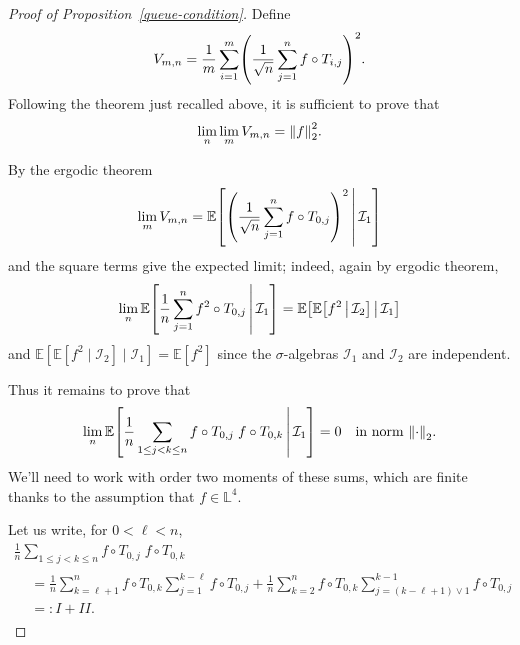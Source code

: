 \documentclass[AHL,Unicode,longabstracts,published]{cedram}
\newcommand*\bbL{\mathbb{L}}
\newcommand{\bbE}{\mathbb{E}}
\newcommand{\E}[1]{\bbE\left[#1\right]}
\newcommand*\I{\mathcal{I}}
\newcommand{\norm}[1]{\left\lVert #1\right\rVert}
\let\originalleft\left
\let\originalright\right
\renewcommand{\left}{\mathopen{}\mathclose\bgroup\originalleft}
\renewcommand{\right}{\aftergroup\egroup\originalright}
\begin{document}
\begin{proof}[Proof of Proposition~\ref{queue-condition}]
Define
\begin{equation}\label{eq:def_Vmn}
V_{m,n}=\frac 1m\sum_{i=1}^m \left(\frac 1{\sqrt n}\sum_{j=1}^n f\circ T_{i,j}\right)^2.
\end{equation}
Following the theorem just recalled above, it is sufficient to prove that
\[
\lim_{n}\lim_{m} V_{m,n}=\norm{f}_2^2.
\]

By the ergodic theorem
\[
\lim_m V_{m,n}= \E{\left(\frac 1{\sqrt n}\sum_{j=1}^n f\circ T_{0,j}\right)^2\,\middle|\,\I_1}
\]
and the square terms give the expected limit; indeed, again by ergodic theorem,
\[
\lim_n \E{\frac 1{n}\sum_{j=1}^n f^2\circ T_{0,j}\,\middle|\,\I_1}=\E{\E{f^2\,\middle|\,\I_2}\,\middle|\,\I_1}
\]
and $\bbE[\bbE[f^2\mid\I_2]\mid\I_1]=\bbE[f^2]$ since the $\sigma$-algebras $\I_1$ and $\I_2$ are independent.

Thus it remains to prove that
\begin{equation}\label{eq:termes-croises}
\lim_n\E{\frac1n\sum_{1\leq j< k\leq n}f\circ T_{0,j}\;f\circ T_{0,k}\,\middle|\,\I_1} =0\quad\text{in norm }\norm{\cdot}_2.
\end{equation}
We'll need to work with order two moments of these sums, which are finite thanks to the assumption that $f\in\bbL^4$.

Let us write, for $0<\ell<n$,
\begin{multline*}
\frac1n\sum_{1\leq j< k\leq n}f\circ T_{0,j}\;f\circ T_{0,k} \\
\begin{aligned}
&=
\frac1n \sum_{k=\ell+1}^{n} f \circ T_{0,k}
\sum_{j=1}^{k-\ell} f \circ T_{0,j} +
\frac1n \sum_{k=2}^{n} f \circ T_{0,k}
\sum_{j=(k-\ell+1)\vee 1}^{k-1} f \circ T_{0,j}\\
&=: I + II.
\end{aligned}
\end{multline*}


\end{proof}
\end{document}
